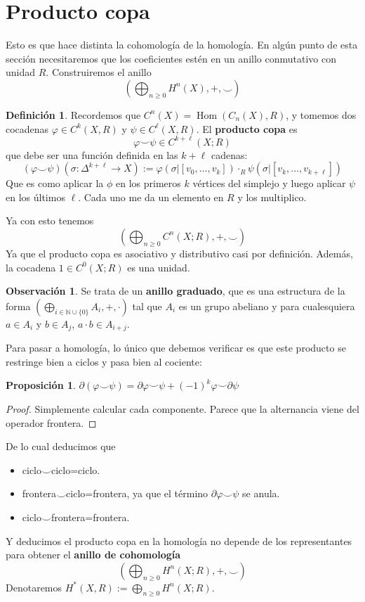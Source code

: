 \documentclass[spanish]{book}
\theoremstyle{definition}
\newtheorem*{defn}{Definición}
\newtheorem*{obs}{Observación}
\newtheorem*{prop}{Proposición}
\newcommand{\N}{\mathbb{N}}
\DeclareMathOperator{\Hom}{Hom}
\begin{document}
\section{Producto copa}
Esto es que hace distinta la cohomología de la homología. En algún punto de esta sección necesitaremos que los coeficientes estén en un anillo conmutativo con unidad $R$. Construiremos el anillo
\[\left(\bigoplus_{n\geq0}H^n(X),+,\smile\right)\]
\begin{defn}
	Recordemos que $C^n(X)=\Hom(C_n(X),R)$, y tomemos dos cocadenas $\varphi\in C^k(X,R)$ y $\psi\in C^\ell(X,R)$. El \textbf{producto copa} es
	\[\varphi\smile\psi\in C^{k+\ell}(X;R)\]
	que debe ser una función definida en las $k+\ell$ cadenas:
	\[(\varphi\smile\psi)(\sigma:\Delta^{k+\ell}\to X):=\varphi(\sigma|[v_0,\ldots,v_k])\cdot_R\psi(\sigma|[v_{k},\ldots,v_{k+\ell}])\]
	Que es como aplicar la $\phi$ en los primeros $k$ vértices del simplejo y luego aplicar $\psi$ en los últimos $\ell$. Cada uno me da un elemento en $R$ y los multiplico.
\end{defn}
Ya con esto tenemos
\[\left(\bigoplus_{n\geq0}C^n(X;R),+,\smile\right)\]
Ya que el producto copa es asociativo y distributivo casi por definición. Además, la cocadena $1\in C^0(X;R)$ es una unidad.
\begin{obs}
	Se trata de un \textbf{anillo graduado}, que es una estructura de la forma $(\bigoplus_{i\in\N\cup\{0\}}A_i,+,\cdot)$ tal que $A_i$ es un grupo abeliano y para cualesquiera $a\in A_i$ y $b\in A_j$, $a\cdot b\in A_{i+j}$.
\end{obs}
Para pasar a homología, lo único que debemos verificar es que este producto se restringe bien a ciclos y pasa bien al cociente:
\begin{prop}
	$\partial(\varphi\smile\psi)=\partial\varphi\smile\psi+(-1)^k\varphi\smile\partial\psi$
\end{prop}
\begin{proof}
	Simplemente calcular cada componente. Parece que la alternancia viene del operador frontera.
\end{proof}
De lo cual deducimos que
\begin{itemize}
	\item ciclo$\smile$ciclo=ciclo.
	\item frontera$\smile$ciclo=frontera, ya que el término $\partial\varphi\smile\psi$ se anula.
	\item ciclo$\smile$frontera=frontera.
\end{itemize}
Y deducimos el producto copa en la homología no depende de los representantes para obtener el \textbf{anillo de cohomología}
\[\left(\bigoplus_{n\geq0}H^n(X;R),+,\smile\right)\]
Denotaremos $H^*(X,R):=\bigoplus_{n\geq0}H^n(X;R)$.
\end{document}
